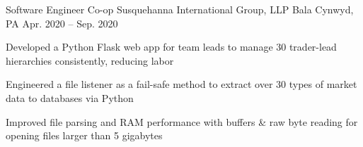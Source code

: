 \begin{cventries}
  \cventry
  {Software Engineer Co-op} %
  {Susquehanna International Group, LLP} %
  {Bala Cynwyd, PA} %
  {Apr. 2020 -- Sep. 2020} %
  {
    \begin{cvitems} %
      \item {Developed a Python Flask web app for team leads to manage 30 trader-lead hierarchies consistently, reducing labor}
      \item {Engineered a file listener as a fail-safe method to extract over 30 types of market data to databases via Python}
      \item {Improved file parsing and RAM performance with buffers \& raw byte reading for opening files larger than 5 gigabytes}
    \end{cvitems}
  }


\end{cventries}
